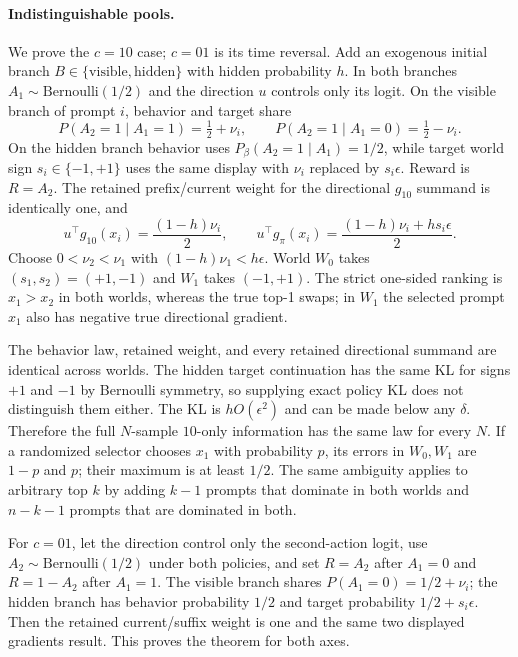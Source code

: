 \documentclass[11pt]{article}
\begin{document}
\paragraph{Indistinguishable pools.}
We prove the $c=10$ case; $c=01$ is its time reversal. Add an exogenous
initial branch $B\in\{\mathrm{visible},\mathrm{hidden}\}$ with hidden
probability $h$. In both branches $A_1\sim\mathrm{Bernoulli}(1/2)$ and the
direction $u$ controls only its logit. On the visible branch of prompt $i$,
behavior and target share
\[
P(A_2=1\mid A_1=1)=\tfrac12+\nu_i,\qquad
P(A_2=1\mid A_1=0)=\tfrac12-\nu_i.
\]
On the hidden branch behavior uses $P_\beta(A_2=1\mid A_1)=1/2$, while target
world sign $s_i\in\{-1,+1\}$ uses the same display with $\nu_i$ replaced by
$s_i\epsilon$. Reward is $R=A_2$. The retained prefix/current weight for the
directional $g_{10}$ summand is identically one, and
\[
u^\top g_{10}(x_i)=\frac{(1-h)\nu_i}{2},\qquad
u^\top g_{\pi}(x_i)=\frac{(1-h)\nu_i+h s_i\epsilon}{2}.
\]
Choose $0<\nu_2<\nu_1$ with
$(1-h)\nu_1<h\epsilon$. World $W_0$ takes
$(s_1,s_2)=(+1,-1)$ and $W_1$ takes $(-1,+1)$. The strict one-sided ranking
is $x_1>x_2$ in both worlds, whereas the true top-1 swaps; in $W_1$ the
selected prompt $x_1$ also has negative true directional gradient.

The behavior law, retained weight, and every retained directional summand are
identical across worlds. The hidden target continuation has the same KL for
signs $+1$ and $-1$ by Bernoulli symmetry, so supplying exact policy KL does
not distinguish them either. The KL is $hO(\epsilon^2)$ and can be made below
any $\delta$. Therefore the full $N$-sample $10$-only information has the same
law for every $N$. If a randomized selector chooses $x_1$ with probability
$p$, its errors in $W_0,W_1$ are $1-p$ and $p$; their maximum is at least
$1/2$. The same ambiguity applies to arbitrary top $k$ by adding $k-1$
prompts that dominate in both worlds and $n-k-1$ prompts that are dominated in
both.

For $c=01$, let the direction control only the second-action logit, use
$A_2\sim\mathrm{Bernoulli}(1/2)$ under both policies, and set
$R=A_2$ after $A_1=0$ and $R=1-A_2$ after $A_1=1$. The visible branch shares
$P(A_1=0)=1/2+\nu_i$; the hidden branch has behavior probability $1/2$ and
target probability $1/2+s_i\epsilon$. Then the retained current/suffix weight
is one and the same two displayed gradients result. This proves the theorem
for both axes.
\end{document}
